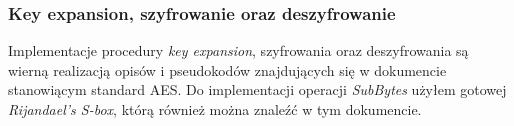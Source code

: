 \subsubsection{Key expansion, szyfrowanie oraz deszyfrowanie}
Implementacje procedury \textit{key expansion}, szyfrowania oraz deszyfrowania są wierną realizacją opisów i pseudokodów znajdujących się w dokumencie stanowiącym standard AES. Do implementacji operacji \textit{SubBytes} użyłem gotowej \textit{Rijandael's S-box}, którą również można znaleźć w tym dokumencie.

